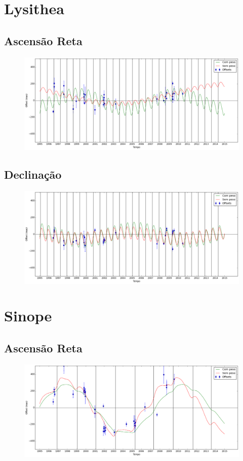\documentclass[11pt,a4paper]{report}
\begin{document}
\chapter*{Lysithea}
\section*{Ascensão Reta}

\begin{figure}[h]
\includegraphics[scale=0.35]{Lysithea/RA.png} 
\end{figure}

\section*{Declinação}

\begin{figure}[h]
\includegraphics[scale=0.35]{Lysithea/DEC.png} 
\end{figure}

\chapter*{Sinope}
\section*{Ascensão Reta}

\begin{figure}[h]
\includegraphics[scale=0.35]{Sinope/RA.png} 
\end{figure}
\end{document}
